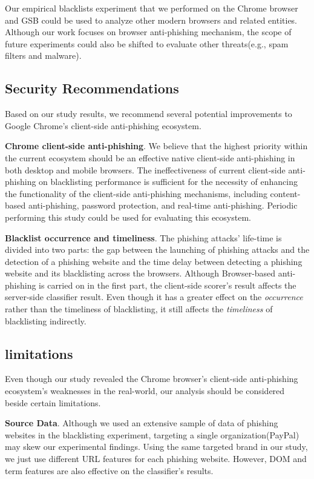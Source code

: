 Our empirical blacklists experiment that we performed on the Chrome browser and GSB could be used to analyze other modern browsers and related entities. 
Although our work focuses on browser anti-phishing mechanism, the scope of future experiments could also be shifted to evaluate other threats(e.g., spam filters and malware). 

\subsection{Security Recommendations}

Based on our study results, we recommend several potential improvements to Google Chrome's client-side anti-phishing ecosystem.

\textbf{Chrome client-side anti-phishing}. We believe that the highest priority within the current ecosystem should be an effective native client-side anti-phishing in both desktop and mobile browsers. The ineffectiveness of current client-side anti-phishing on blacklisting performance is sufficient for the necessity of enhancing the functionality of the client-side anti-phishing mechanisms, including content-based anti-phishing, password protection, and real-time anti-phishing. Periodic performing this study could be used for evaluating this ecosystem.

\textbf{Blacklist occurrence and timeliness}. The phishing attacks' life-time is divided into two parts: the gap between the launching of phishing attacks and the detection of a phishing website and the time delay between detecting a phishing website and its blacklisting across the browsers.
Although Browser-based anti-phishing is carried on in the first part, the client-side scorer's result affects the server-side classifier result. Even though it has a greater effect on the \textit{occurrence} rather than the timeliness of blacklisting, it still affects the \textit{timeliness} of blacklisting indirectly. 

\subsection{limitations}
Even though our study revealed the Chrome browser's client-side anti-phishing ecosystem's weaknesses in the real-world, our analysis should be considered beside certain limitations.

\textbf{Source Data}. Although we used an extensive sample of data of phishing websites in the blacklisting experiment, targeting a single organization(PayPal) may skew our experimental findings. 
Using the same targeted brand in our study, we just use different URL features for each phishing website. However, DOM and term features are also effective on the classifier's results. 

